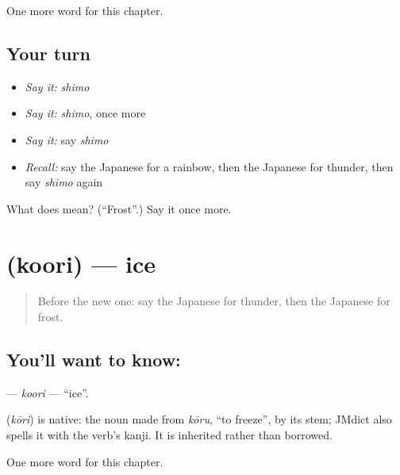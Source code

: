 \begin{grammarlens}[title={What you've built}]
One more word for this chapter.
\end{grammarlens}

\subsection*{Your turn}
\begin{itemize}
\raggedright
  \item \emph{Say it:} \emph{shimo}
  \item \emph{Say it:} \emph{shimo}, once more
  \item \emph{Say it:} say \emph{shimo}
  \item \emph{Recall:} say the Japanese for a rainbow, then the Japanese for thunder, then say \emph{shimo} again
\end{itemize}

\begin{tcolorbox}[breakable,colback=teal!4,colframe=teal!35!black,title={Before you move on}]
What does  mean? (\textquotedblleft{}Frost\textquotedblright{}.) Say it once more.
\end{tcolorbox}
\section[\texorpdfstring{\ja{こおり} (koori)}{こおり (koori)}]{ (koori) — ice}

\label{lesson:JA-C69-koori}



\begin{quote}
Before the new one: say the Japanese for thunder, then the Japanese for frost.
\end{quote}

\subsection*{You'll want to know: }
\textbf{} — \emph{koori} — \textquotedblleft{}ice\textquotedblright{}.

\begin{cousinweb}
\textbf{} (\emph{kōri}) is native: the noun made from \emph{kōru}, \textquotedblleft{}to freeze\textquotedblright{}, by its stem; JMdict also spells it with the verb's kanji. It is inherited rather than borrowed.
\end{cousinweb}

\begin{grammarlens}[title={What you've built}]
One more word for this chapter.
\end{grammarlens}


